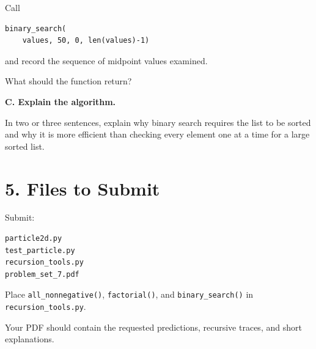 \documentclass[11pt]{article}
\begin{document}
Call

\begin{lstlisting}
binary_search(
    values, 50, 0, len(values)-1)
\end{lstlisting}

and record the sequence of midpoint values examined.

What should the function return?

\textbf{C. Explain the algorithm.}

In two or three sentences, explain why binary search requires the list
to be sorted and why it is more efficient than checking every element
one at a time for a large sorted list.

\section*{5. Files to Submit}

Submit:

\begin{lstlisting}
particle2d.py
test_particle.py
recursion_tools.py
problem_set_7.pdf
\end{lstlisting}

Place \texttt{all\_nonnegative()}, \texttt{factorial()}, and
\texttt{binary\_search()} in \texttt{recursion\_tools.py}.

Your PDF should contain the requested predictions, recursive traces,
and short explanations.
\end{document}
